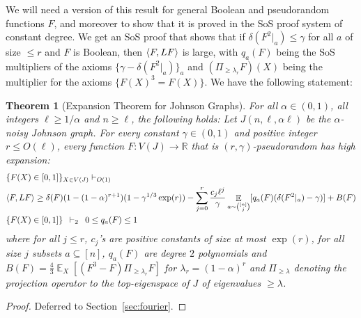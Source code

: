 \documentclass[11pt]{article}
\DeclareMathOperator*{\E}{\mathbb{E}}
\DeclarePairedDelimiter\ip{\langle}{\rangle}
\def \R {\mathbb{R}}
\def \sos {SoS\xspace}
\def \eps {{\varepsilon}}
\newtheorem{theorem}{Theorem}[section]
\theoremstyle{definition}
\begin{document}
We will need a version of this 
result for general Boolean and pseudorandom functions $F$, and moreover to show that it is proved in the 
\sos proof system of constant degree. We get an \sos proof that shows that if $\delta(F^2|_a) \leq \gamma$ for all $a$ of size $\leq r$ and $F$ is Boolean, then $\ip{F,LF}$ is large, with $q_a(F)$ being the SoS multipliers of the axioms $\{\gamma - \delta(F^2|_a)\}_a$ and $(\Pi_{\geq \lambda_r}F)(X)$ being the multiplier for the axioms $\{F(X)^3 = F(X)\}$. We have the following statement: 


\begin{theorem}[Expansion Theorem for Johnson Graphs]\label{thm:structure-johnson}
For all $\alpha \in (0,1)$, all integers $\ell \geq 1/\alpha$ and $n \geq \ell$, the following holds: Let $J(n,\ell,\alpha \ell)$ be the $\alpha$-noisy Johnson graph. For every constant $\gamma \in (0,1)$ and positive integer $r \leq O(\ell)$, every function $F: V(J) \rightarrow \R$ that is $(r,\gamma)$-pseudorandom has high expansion:
\begin{align}
&\{F(X) \in [0,1]\}_{X \in V(J)}  \vdash_{O(1)}\, \notag\\
&\ip{F,LF} \geq \delta(F)(1 - (1-\alpha)^{r+1})(1- \gamma^{1/3}\exp(r)) - \sum_{j = 0}^r \frac{ c_j\ell^{j}}{\gamma}\E_{a \sim {[n] \choose j}}[q_a(F)({\delta(F^{2}|_a) - \gamma)}]+ B(F) \\
&\{F(X) \in [0,1]\} \,\,\, \vdash_{2} \,\,\, 0 \leq q_a(F) \leq 1 
\end{align}
where for all $j \leq r$, $c_j$'s are positive constants of size at most
$\exp(r)$, for all size $j$ subsets $a \subseteq [n]$, $q_a(F)$ are degree $2$  polynomials and $B(F)=\frac{4}{3}\E_X[(F^{3} - F)\Pi_{\geq \lambda_r}F ]$ for $\lambda_r = (1-\alpha)^r$ and $\Pi_{\geq \lambda}$ denoting the projection operator to the top-eigenspace of $J$ of eigenvalues $\geq \lambda$.
\end{theorem}
\begin{proof}
Deferred to Section~\ref{sec:fourier}.
\end{proof}
\end{document}
